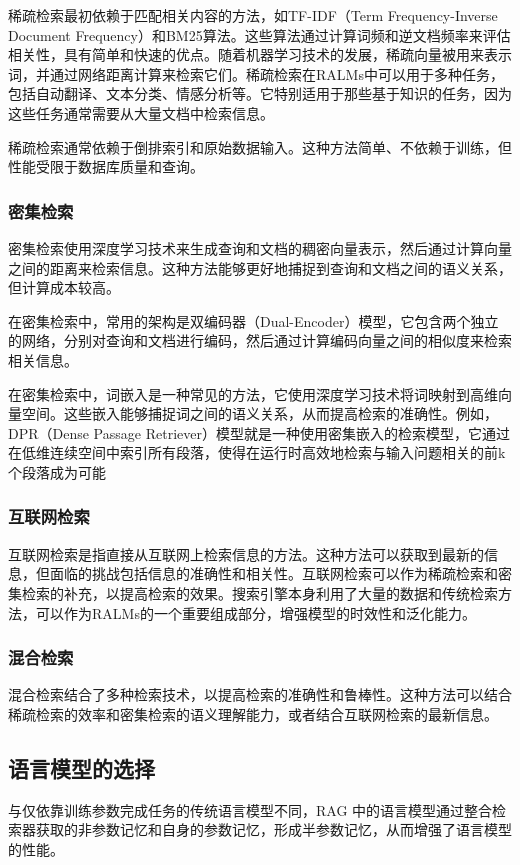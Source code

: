 稀疏检索最初依赖于匹配相关内容的方法，如TF-IDF（Term Frequency-Inverse Document Frequency）和BM25算法。这些算法通过计算词频和逆文档频率来评估相关性，具有简单和快速的优点。随着机器学习技术的发展，稀疏向量被用来表示词，并通过网络距离计算来检索它们。稀疏检索在RALMs中可以用于多种任务，包括自动翻译、文本分类、情感分析等。它特别适用于那些基于知识的任务，因为这些任务通常需要从大量文档中检索信息。

稀疏检索通常依赖于倒排索引和原始数据输入。这种方法简单、不依赖于训练，但性能受限于数据库质量和查询。

\subsubsection{密集检索}
密集检索使用深度学习技术来生成查询和文档的稠密向量表示，然后通过计算向量之间的距离来检索信息。这种方法能够更好地捕捉到查询和文档之间的语义关系，但计算成本较高。

在密集检索中，常用的架构是双编码器（Dual-Encoder）模型，它包含两个独立的网络，分别对查询和文档进行编码，然后通过计算编码向量之间的相似度来检索相关信息。

在密集检索中，词嵌入是一种常见的方法，它使用深度学习技术将词映射到高维向量空间。这些嵌入能够捕捉词之间的语义关系，从而提高检索的准确性。例如，DPR（Dense Passage Retriever）模型\cite{karpukhin2020densepassageretrievalopendomain}就是一种使用密集嵌入的检索模型，它通过在低维连续空间中索引所有段落，使得在运行时高效地检索与输入问题相关的前k个段落成为可能

\subsubsection{互联网检索}
互联网检索是指直接从互联网上检索信息的方法。这种方法可以获取到最新的信息，但面临的挑战包括信息的准确性和相关性。互联网检索可以作为稀疏检索和密集检索的补充，以提高检索的效果。搜索引擎本身利用了大量的数据和传统检索方法，可以作为RALMs的一个重要组成部分，增强模型的时效性和泛化能力。\cite{komeili2021internetaugmenteddialoguegeneration}
\subsubsection{混合检索}
混合检索结合了多种检索技术，以提高检索的准确性和鲁棒性。这种方法可以结合稀疏检索的效率和密集检索的语义理解能力，或者结合互联网检索的最新信息。\cite{lazaridou2022internetaugmentedlanguagemodelsfewshot}\cite{boytsov2016off}
\subsection{语言模型的选择}
与仅依靠训练参数完成任务的传统语言模型不同，RAG 中的语言模型通过整合检索器获取的非参数记忆和自身的参数记忆，形成半参数记忆，从而增强了语言模型的性能。
